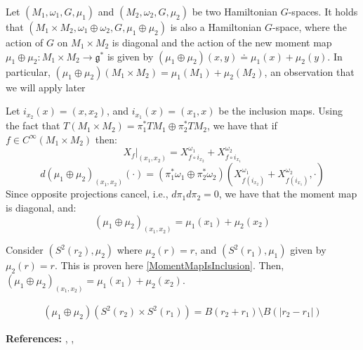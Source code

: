 \begin{lemma}
Let \((M_1, \omega_1, G, \mu_1)\) and \((M_2, \omega_2, G, \mu_2)\) be two Hamiltonian \(G\)-spaces. It holds that 
\((M_1 \times M_2, \omega_1 \oplus \omega_2, G, \mu_1 \oplus \mu_2)\) is also a Hamiltonian \(G\)-space, where the action of $G$ on \(M_1 \times M_2\) is diagonal and the action of the new moment map $\mu_1 \oplus \mu_2: M_1 \times M_2 \rightarrow \mathfrak{g}^*$ is given by $(\mu_1 \oplus \mu_2)(x, y) \doteq \mu_1(x) + \mu_2(y)$. In particular, $(\mu_1 \oplus \mu_2)(M_1 \times M_2) = \mu_1(M_1) + \mu_2(M_2)$, an observation that we will apply later \end{lemma}
Let $i_{x_{2}}(x) = (x, x_{2})$, and $i_{x_{1}}(x) = (x_{1}, x)$ be the inclusion maps. Using the fact that $T(M_{1} \times M_{2}) = \pi_{1}^{*}TM_{1} \oplus \pi_{2}^{*}TM_{2}$, we have that if $f \in C^{\infty}(M_{1} \times M_{2})$ then:
\begin{equation}
X_f|_{(x_1, x_2)} = X_{f \circ i_{x_2}}^{\omega_1} + X_{f \circ i_{x_1}}^{\omega_2}
\end{equation}
\begin{equation}
d(\mu_1 \oplus \mu_2)_{(x_{1}, x_{2})}(\cdot) = (\pi_{1}^{*}\omega_{1} \oplus \pi_{2}^{*}\omega_{2})(X_{f(i_{x_{2}})}^{\omega_{1}} + X_{f(i_{x_{1}})}^{\omega_{2}}, \cdot)
\end{equation}
Since opposite projections cancel, i.e., $d\pi_{1}d\pi_{2} = 0$, we have that the moment map is diagonal, and:
\begin{equation}
(\mu_1 \oplus \mu_2)_{(x_{1}, x_{2})} = \mu_{1}(x_{1}) + \mu_{2}(x_{2})
\end{equation}

\begin{example}

Consider $(S^{2}(r_{2}), \mu_{2})$ where $\mu_{2}(r) = r$, and $(S^{2}(r_{1}), \mu_{1})$ given by $\mu_{2}(r) = r$. This is proven here \ref{MomentMapIsInclusion}. Then, $(\mu_1 \oplus \mu_2)_{(x_{1}, x_{2})} = \mu_{1}(x_{1}) + \mu_{2}(x_{2})$. 

\begin{align}
(\mu_1 \oplus \mu_2)(S^{2}(r_{2}) \times S^{2}(r_{1})) = B(r_{2} + r_{1}) \setminus B(|r_{2} - r_{1}|) 
\end{align}

\end{example}

\noindent \textbf{References:} \textcite{Arnold2010}, \textcite{Silva2001}, \textcite{Terek2020}